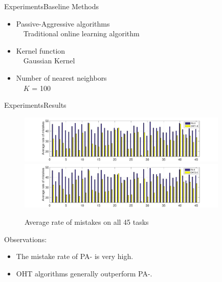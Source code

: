 \documentclass{beamer}
\begin{document}
\begin{frame}{Experiments}{Baseline Methods}
\begin{itemize}
\item
Passive-Aggressive algorithms \\
~~Traditional online learning algorithm
\item
Kernel function \\
~~Gaussian Kernel
\item
Number of nearest neighbors \\
~~$K$ = 100
\end{itemize}
\end{frame}

\begin{frame}{Experiments}{Results}
\begin{figure}
\centering
  \subfigure
  {
    \includegraphics[width=10cm]{12_2.pdf}
  }
  \subfigure
  {
    \includegraphics[width=10cm]{22_2.pdf}
  }
  \caption{Average rate of mistakes on all 45 tasks}
\end{figure}
\begin{footnotesize}
Observations:
\begin{itemize}
\item
The mistake rate of PA-\uppercase\expandafter{} is very high.
\item
OHT algorithms generally outperform PA-\uppercase\expandafter{}.
\end{itemize}
\end{footnotesize}
\end{frame}
\end{document}
